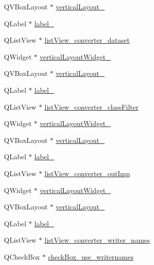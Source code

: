 \begin{DoxyCompactItemize}
\item 
Q\+V\+Box\+Layout $\ast$ \hyperlink{class_ui___main_window_a7b66d5d6ab55f3977317359d09a42345}{vertical\+Layout\+\_}
\item 
Q\+Label $\ast$ \hyperlink{class_ui___main_window_a13936e6f18b1c90402b3c7a3c92b6cdb}{label\+\_}
\item 
Q\+List\+View $\ast$ \hyperlink{class_ui___main_window_ab880027088604be2d2a85082180455ca}{list\+View\+\_\+converter\+\_\+dataset}
\item 
Q\+Widget $\ast$ \hyperlink{class_ui___main_window_ad8004b01946b6868d7b39be5e1bb649c}{vertical\+Layout\+Widget\+\_}
\item 
Q\+V\+Box\+Layout $\ast$ \hyperlink{class_ui___main_window_aaa8cc393d5a44562d629a9f646d2c6dd}{vertical\+Layout\+\_}
\item 
Q\+Label $\ast$ \hyperlink{class_ui___main_window_af183bfbfb9f38bbdd60caf92b15e23dc}{label\+\_}
\item 
Q\+List\+View $\ast$ \hyperlink{class_ui___main_window_a9d4975188649658fbba7dc50f796019b}{list\+View\+\_\+converter\+\_\+class\+Filter}
\item 
Q\+Widget $\ast$ \hyperlink{class_ui___main_window_a2f44615c80d2a1c4cf6add71e4505368}{vertical\+Layout\+Widget\+\_}
\item 
Q\+V\+Box\+Layout $\ast$ \hyperlink{class_ui___main_window_afb1464f1d82290bdb55ce9c30a62c2c5}{vertical\+Layout\+\_}
\item 
Q\+Label $\ast$ \hyperlink{class_ui___main_window_a0e90c7e9ad77386881e0b264ddb9dd22}{label\+\_}
\item 
Q\+List\+View $\ast$ \hyperlink{class_ui___main_window_a8d24a02a61fd90cf443ea262d63b7af3}{list\+View\+\_\+converter\+\_\+out\+Imp}
\item 
Q\+Widget $\ast$ \hyperlink{class_ui___main_window_a585f129a9a277e8ad1c85b7f5ac39fee}{vertical\+Layout\+Widget\+\_}
\item 
Q\+V\+Box\+Layout $\ast$ \hyperlink{class_ui___main_window_a9e1811fba10637642b5cc2b70a274862}{vertical\+Layout\+\_}
\item 
Q\+Label $\ast$ \hyperlink{class_ui___main_window_a1d172080d9aa586d10482cd8b94a90d7}{label\+\_}
\item 
Q\+List\+View $\ast$ \hyperlink{class_ui___main_window_a7a26850212ec1827adbade5ef2eaf48b}{list\+View\+\_\+converter\+\_\+writer\+\_\+names}
\item 
Q\+Check\+Box $\ast$ \hyperlink{class_ui___main_window_a40e53c5773a8f45a8141f90d1bc90fe1}{check\+Box\+\_\+use\+\_\+writernames}

\end{DoxyCompactItemize}
